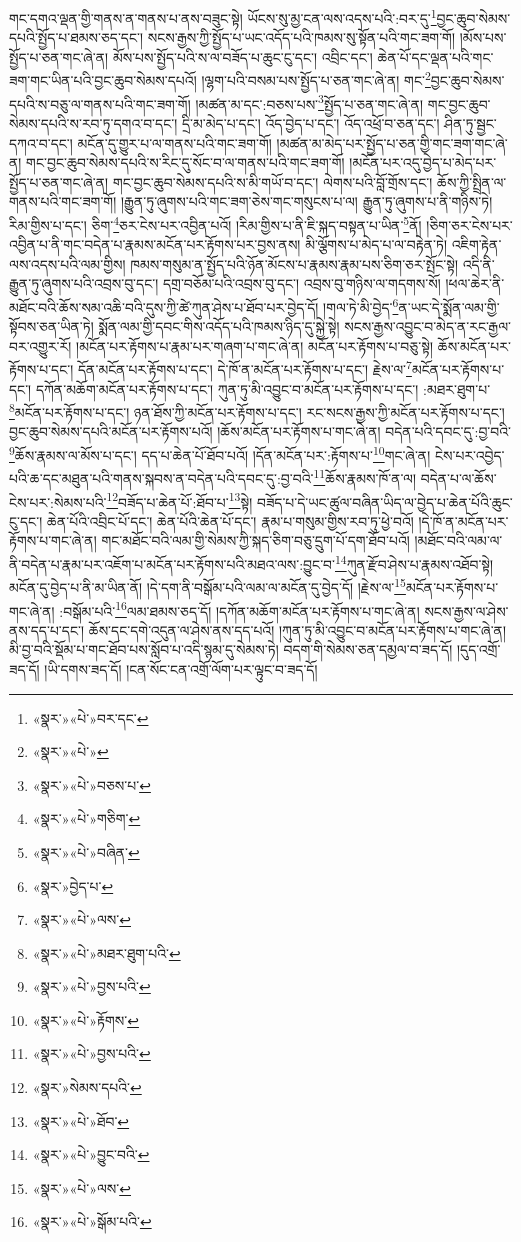 གང་དགའ་ལྡན་གྱི་གནས་ན་གནས་པ་ནས་བཟུང་སྟེ། ཡོངས་སུ་མྱ་ངན་ལས་འདས་པའི་:བར་དུ་\footnote{«སྣར་»«པེ་»བར་དང་}བྱང་ཆུབ་སེམས་དཔའི་སྤྱོད་པ་ཐམས་ཅད་དང་། སངས་རྒྱས་ཀྱི་སྤྱོད་པ་ཡང་འདོད་པའི་ཁམས་སུ་སྟོན་པའི་གང་ཟག་གོ། །མོས་པས་སྤྱོད་པ་ཅན་གང་ཞེ་ན། མོས་པས་སྤྱོད་པའི་ས་ལ་བཟོད་པ་ཆུང་ངུ་དང་། འབྲིང་དང་། ཆེན་པོ་དང་ལྡན་པའི་གང་ཟག་གང་ཡིན་པའི་བྱང་ཆུབ་སེམས་དཔའོ། །ལྷག་པའི་བསམ་པས་སྤྱོད་པ་ཅན་གང་ཞེ་ན། གང་\footnote{«སྣར་»«པེ་»}བྱང་ཆུབ་སེམས་དཔའི་ས་བཅུ་ལ་གནས་པའི་གང་ཟག་གོ། །མཚན་མ་དང་:བཅས་པས་\footnote{«སྣར་»«པེ་»བཅས་པ་}སྤྱོད་པ་ཅན་གང་ཞེ་ན། གང་བྱང་ཆུབ་སེམས་དཔའི་ས་རབ་ཏུ་དགའ་བ་དང་། དྲི་མ་མེད་པ་དང་། འོད་བྱེད་པ་དང་། འོད་འཕྲོ་བ་ཅན་དང་། ཤིན་ཏུ་སྦྱང་དཀའ་བ་དང་། མངོན་དུ་གྱུར་པ་ལ་གནས་པའི་གང་ཟག་གོ། །མཚན་མ་མེད་པར་སྤྱོད་པ་ཅན་གྱི་གང་ཟག་གང་ཞེ་ན། གང་བྱང་ཆུབ་སེམས་དཔའི་ས་རིང་དུ་སོང་བ་ལ་གནས་པའི་གང་ཟག་གོ། །མངོན་པར་འདུ་བྱེད་པ་མེད་པར་སྤྱོད་པ་ཅན་གང་ཞེ་ན། གང་བྱང་ཆུབ་སེམས་དཔའི་ས་མི་གཡོ་བ་དང་། ལེགས་པའི་བློ་གྲོས་དང་། ཆོས་ཀྱི་སྤྲིན་ལ་གནས་པའི་གང་ཟག་གོ། །རྒྱུན་ཏུ་ཞུགས་པའི་གང་ཟག་ཅེས་གང་གསུངས་པ་ལ། རྒྱུན་ཏུ་ཞུགས་པ་ནི་གཉིས་ཏེ། རིམ་གྱིས་པ་དང་། ཅིག་\footnote{«སྣར་»«པེ་»གཅིག་}ཅར་ངེས་པར་འབྱིན་པའོ། །རིམ་གྱིས་པ་ནི་ཇི་སྐད་བསྟན་པ་ཡིན་\footnote{«སྣར་»«པེ་»བཞིན་}ནོ། །ཅིག་ཅར་ངེས་པར་འབྱིན་པ་ནི་གང་བདེན་པ་རྣམས་མངོན་པར་རྟོགས་པར་བྱས་ནས། མི་ལྕོགས་པ་མེད་པ་ལ་བརྟེན་ཏེ། འཇིག་རྟེན་ལས་འདས་པའི་ལམ་གྱིས། ཁམས་གསུམ་ན་སྤྱོད་པའི་ཉོན་མོངས་པ་རྣམས་རྣམ་པས་ཅིག་ཅར་སྤོང་སྟེ། འདི་ནི་རྒྱུན་ཏུ་ཞུགས་པའི་འབྲས་བུ་དང་། དགྲ་བཅོམ་པའི་འབྲས་བུ་དང་། འབྲས་བུ་གཉིས་ལ་གདགས་སོ། །ཕལ་ཆེར་ནི་མཐོང་བའི་ཆོས་སམ་འཆི་བའི་དུས་ཀྱི་ཚེ་ཀུན་ཤེས་པ་ཐོབ་པར་བྱེད་དོ། །གལ་ཏེ་མི་བྱེད་\footnote{«སྣར་»བྱེད་པ་}ན་ཡང་དེ་སྨོན་ལམ་གྱི་སྟོབས་ཅན་ཡིན་ཏེ། སྨོན་ལམ་གྱི་དབང་གིས་འདོད་པའི་ཁམས་ཉིད་དུ་སྐྱེ་སྟེ། སངས་རྒྱས་འབྱུང་བ་མེད་ན་རང་རྒྱལ་བར་འགྱུར་རོ། །མངོན་པར་རྟོགས་པ་རྣམ་པར་གཞག་པ་གང་ཞེ་ན། མངོན་པར་རྟོགས་པ་བཅུ་སྟེ། ཆོས་མངོན་པར་རྟོགས་པ་དང་། དོན་མངོན་པར་རྟོགས་པ་དང་། དེ་ཁོ་ན་མངོན་པར་རྟོགས་པ་དང་། རྗེས་ལ་\footnote{«སྣར་»«པེ་»ལས་}མངོན་པར་རྟོགས་པ་དང་། དཀོན་མཆོག་མངོན་པར་རྟོགས་པ་དང་། ཀུན་ཏུ་མི་འབྱུང་བ་མངོན་པར་རྟོགས་པ་དང་། :མཐར་ཐུག་པ་\footnote{«སྣར་»«པེ་»མཐར་ཐུག་པའི་}མངོན་པར་རྟོགས་པ་དང་། ཉན་ཐོས་ཀྱི་མངོན་པར་རྟོགས་པ་དང་། རང་སངས་རྒྱས་ཀྱི་མངོན་པར་རྟོགས་པ་དང་། བྱང་ཆུབ་སེམས་དཔའི་མངོན་པར་རྟོགས་པའོ། །ཆོས་མངོན་པར་རྟོགས་པ་གང་ཞེ་ན། བདེན་པའི་དབང་དུ་:བྱ་བའི་\footnote{«སྣར་»«པེ་»བྱས་པའི་}ཆོས་རྣམས་ལ་མོས་པ་དང་། དད་པ་ཆེན་པོ་ཐོབ་པའོ། །དོན་མངོན་པར་:རྟོགས་པ་\footnote{«སྣར་»«པེ་»རྟོགས་}གང་ཞེ་ན། ངེས་པར་འབྱེད་པའི་ཆ་དང་མཐུན་པའི་གནས་སྐབས་ན་བདེན་པའི་དབང་དུ་:བྱ་བའི་\footnote{«སྣར་»«པེ་»བྱས་པའི་}ཆོས་རྣམས་ཁོ་ན་ལ། བདེན་པ་ལ་ཆོས་ངེས་པར་:སེམས་པའི་\footnote{«སྣར་»སེམས་དཔའི་}བཟོད་པ་ཆེན་པོ་:ཐོབ་པ་\footnote{«སྣར་»«པེ་»ཐོབ་}སྟེ། བཟོད་པ་དེ་ཡང་ཚུལ་བཞིན་ཡིད་ལ་བྱེད་པ་ཆེན་པོའི་ཆུང་ངུ་དང་། ཆེན་པོའི་འབྲིང་པོ་དང་། ཆེན་པོའི་ཆེན་པོ་དང་། རྣམ་པ་གསུམ་གྱིས་རབ་ཏུ་ཕྱེ་བའོ། །དེ་ཁོ་ན་མངོན་པར་རྟོགས་པ་གང་ཞེ་ན། གང་མཐོང་བའི་ལམ་གྱི་སེམས་ཀྱི་སྐད་ཅིག་བཅུ་དྲུག་པོ་དག་ཐོབ་པའོ། །མཐོང་བའི་ལམ་ལ་ནི་བདེན་པ་རྣམ་པར་འཇོག་པ་མངོན་པར་རྟོགས་པའི་མཐའ་ལས་:བྱུང་བ་\footnote{«སྣར་»«པེ་»བྱུང་བའི་}ཀུན་རྫོབ་ཤེས་པ་རྣམས་འཐོབ་སྟེ། མངོན་དུ་བྱེད་པ་ནི་མ་ཡིན་ནོ། །དེ་དག་ནི་བསྒོམ་པའི་ལམ་ལ་མངོན་དུ་བྱེད་དོ། །རྗེས་ལ་\footnote{«སྣར་»«པེ་»ལས་}མངོན་པར་རྟོགས་པ་གང་ཞེ་ན། :བསྒོམ་པའི་\footnote{«སྣར་»«པེ་»སྒོམ་པའི་}ལམ་ཐམས་ཅད་དོ། །དཀོན་མཆོག་མངོན་པར་རྟོགས་པ་གང་ཞེ་ན། སངས་རྒྱས་ལ་ཤེས་ནས་དད་པ་དང་། ཆོས་དང་དགེ་འདུན་ལ་ཤེས་ནས་དད་པའོ། །ཀུན་ཏུ་མི་འབྱུང་བ་མངོན་པར་རྟོགས་པ་གང་ཞེ་ན། མི་བྱ་བའི་སྡོམ་པ་གང་ཐོབ་པས་སློབ་པ་འདི་སྙམ་དུ་སེམས་ཏེ། བདག་གི་སེམས་ཅན་དམྱལ་བ་ཟད་དོ། །དུད་འགྲོ་ཟད་དོ། །ཡི་དགས་ཟད་དོ། །ངན་སོང་ངན་འགྲོ་ལོག་པར་ལྟུང་བ་ཟད་དོ། 